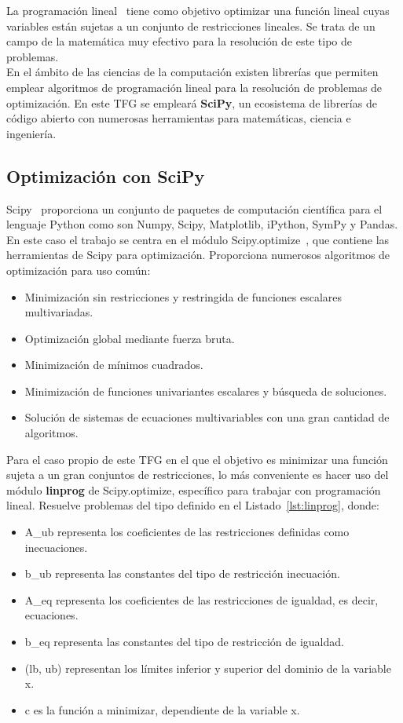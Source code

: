 La programación lineal~\cite{Loom64} tiene como objetivo optimizar una función lineal cuyas variables están sujetas a un conjunto de restricciones lineales.
Se trata de un campo de la matemática muy efectivo para la resolución de este tipo de problemas.\\

En el ámbito de las ciencias de la computación existen librerías que permiten emplear algoritmos de programación lineal para la resolución de problemas de optimización. En este \gls{TFG} se empleará \textbf{SciPy}, un ecosistema de librerías de código abierto con numerosas herramientas para matemáticas, ciencia e ingeniería.

\subsection{Optimización con SciPy}
Scipy~\cite{Scip} proporciona un conjunto de paquetes de computación científica para el lenguaje Python como son Numpy, Scipy, Matplotlib, iPython, SymPy y Pandas. En este caso el trabajo se centra en el módulo Scipy.optimize~\cite{SciOp}, que contiene las herramientas de Scipy para optimización. Proporciona numerosos algoritmos de optimización para uso común:
\begin{itemize}
\item Minimización sin restricciones y restringida de funciones escalares multivariadas.
\item Optimización global mediante fuerza bruta.
\item Minimización de mínimos cuadrados.
\item Minimización de funciones univariantes escalares y búsqueda de soluciones.
\item Solución de sistemas de ecuaciones multivariables con una gran cantidad de algoritmos.
\end{itemize}
Para el caso propio de este \gls{TFG} en el que el objetivo es minimizar una función sujeta a un gran conjuntos de restricciones, lo más conveniente es hacer uso del módulo \textbf{linprog} de Scipy.optimize, específico para trabajar con programación lineal. Resuelve problemas del tipo definido en el Listado~\ref{lst:linprog}, donde:
\begin{itemize}
\item A\_ub representa los coeficientes de las restricciones definidas como inecuaciones.
\item b\_ub representa las constantes del tipo de restricción inecuación.
\item A\_eq representa los coeficientes de las restricciones de igualdad, es decir, ecuaciones.
\item b\_eq representa las constantes del tipo de restricción de igualdad.
\item (lb, ub) representan los límites inferior y superior del dominio de la variable x.
\item c es la función a minimizar, dependiente de la variable x.
\end{itemize}
